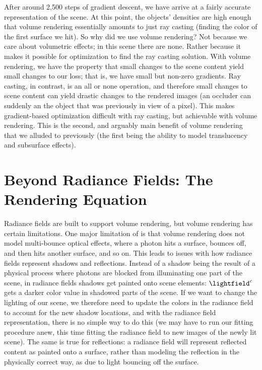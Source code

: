 After around 2,500 steps of gradient descent, we have arrive at a fairly accurate representation of the scene. At this point, the objects' densities are high enough that 
volume rendering essentially amounts to just ray casting (finding the color of the first surface we hit). So why did we use volume rendering? 
Not because we care about volumetric effects; in this scene there are none. Rather because it makes it possible for optimization to find the ray casting solution. With volume rendering, we have the property that small changes to the scene content yield small changes to our loss; that is, we have small but non-zero gradients. Ray casting, in contrast, is an all or none operation, and therefore small changes to scene content can yield drastic changes to the rendered images (an occluder can suddenly an the object that was previously in view of a pixel). This makes gradient-based optimization difficult with ray casting, but achievable with volume rendering. This is the second, and arguably main benefit of volume rendering that we alluded to previously (the first being the ability to model translucency and subsurface effects).


\section{Beyond Radiance Fields: The Rendering Equation}

Radiance fields are built to support volume rendering, but volume rendering has certain limitations. One major limitation of is that volume rendering does not model multi-bounce optical effects, where a photon hits a surface, bounces off, and then hits another surface, and so on. This leads to issues with how radiance fields represent shadows and reflections. Instead of a shadow being the result of a physical process where photons are blocked from illuminating one part of the scene, in radiance fields shadows get painted onto scene elements: $\lightfield^c$ gets a darker color value in shadowed parts of the scene. If we want to change the lighting of our scene, we therefore need to update the colors in the radiance field to account for the new shadow locations, and with the radiance field representation, there is no simple way to do this (we may have to run our fitting procedure anew, this time fitting the radiance field to new images of the newly lit scene). The same is true for reflections: a radiance field will represent reflected content as painted onto a surface, rather than modeling the reflection in the physically correct way, as due to light bouncing off the surface.

